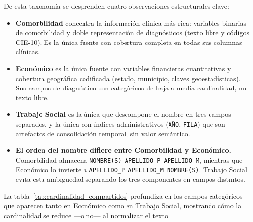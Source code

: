 De esta taxonomía se desprenden cuatro observaciones estructurales clave:

\begin{itemize}
    \item \textbf{Comorbilidad} concentra la información clínica más rica: variables binarias de comorbilidad y doble representación de diagnósticos (texto libre y códigos CIE-10). Es la única fuente con cobertura completa en todas sus columnas clínicas.

    \item \textbf{Económico} es la única fuente con variables financieras cuantitativas y cobertura geográfica codificada (estado, municipio, claves geoestadísticas). Sus campos de diagnóstico son categóricos de baja a media cardinalidad, no texto libre.

    \item \textbf{Trabajo Social} es la única que descompone el nombre en tres campos separados, y la única con índices administrativos (\texttt{AÑO}, \texttt{FILA}) que son artefactos de consolidación temporal, sin valor semántico.

    \item \textbf{El orden del nombre difiere entre Comorbilidad y Económico.} Comorbilidad almacena \texttt{NOMBRE(S) APELLIDO\_P APELLIDO\_M}, mientras que Económico lo invierte a \texttt{APELLIDO\_P APELLIDO\_M NOMBRE(S)}. Trabajo Social evita esta ambigüedad separando los tres componentes en campos distintos.
\end{itemize}

La tabla~\ref{tab:cardinalidad_compartidos} profundiza en los campos categóricos que aparecen tanto en Económico como en Trabajo Social, mostrando cómo la cardinalidad se reduce ---o no--- al normalizar el texto.

\begin{table}[H]
\centering
\caption{Cardinalidad de campos compartidos --- Económico vs.\ Trabajo Social}
\label{tab:cardinalidad_compartidos}
\small
{}
\end{table}

